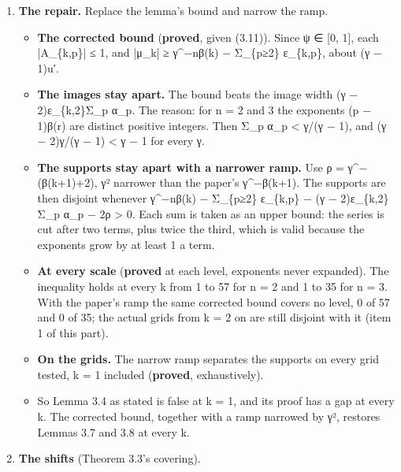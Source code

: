\begin{enumerate}
\begin{itemize}
\item The proof first bounds (3.11), μ with each α\_\allowbreak{}p cut to its first k terms, α\_\allowbreak{}p − ε\_\allowbreak{}\{k,p\}. That bound holds: its least gap on every grid tested is the last column, at least the margin, and exactly on it at k = 1.
\item It then says the tails Σ\_\allowbreak{}p ε\_\allowbreak{}\{k,p\}A\_\allowbreak{}\{k,p\}, with A\_\allowbreak{}\{k,p\} = ψ(d\_\allowbreak{}p) − ψ(d′\_\allowbreak{}p), are “too small to annihilate” γ\textasciicircum{}−nβ(k). That is true, and it does not retain |μ\_\allowbreak{}k| at or above γ\textasciicircum{}−nβ(k): at k = 1 the tails pull it from 10 units to 9.0999099….
\item So the lemma's bound fails at k = 1. At every k the proof's last step does not prove it.
\end{itemize}
\item \textbf{The repair.} Replace the lemma's bound and narrow the ramp.

\begin{itemize}
\item \textbf{The corrected bound} (\textbf{proved}, given (3.11)). Since ψ ∈ [0, 1], each |A\_\allowbreak{}\{k,p\}| ≤ 1, and |μ\_\allowbreak{}k| ≥ γ\textasciicircum{}−nβ(k) − Σ\_\allowbreak{}\{p≥2\} ε\_\allowbreak{}\{k,p\}, about (γ − 1)u′.
\item \textbf{The images stay apart.} The bound beats the image width (γ − 2)ε\_\allowbreak{}\{k,2\}Σ\_\allowbreak{}p α\_\allowbreak{}p. The reason: for n = 2 and 3 the exponents (p − 1)β(r) are distinct positive integers. Then Σ\_\allowbreak{}p α\_\allowbreak{}p < γ/(γ − 1), and (γ − 2)γ/(γ − 1) < γ − 1 for every γ.
\item \textbf{The supports stay apart with a narrower ramp.} Use ρ = γ\textasciicircum{}−(β(k+1)+2), γ² narrower than the paper's γ\textasciicircum{}−β(k+1). The supports are then disjoint whenever γ\textasciicircum{}−nβ(k) − Σ\_\allowbreak{}\{p≥2\} ε\_\allowbreak{}\{k,p\} − (γ − 2)ε\_\allowbreak{}\{k,2\}Σ\_\allowbreak{}p α\_\allowbreak{}p − 2ρ > 0. Each sum is taken as an upper bound: the series is cut after two terms, plus twice the third, which is valid because the exponents grow by at least 1 a term.
\item \textbf{At every scale} (\textbf{proved} at each level, exponents never expanded). The inequality holds at every k from 1 to 57 for n = 2 and 1 to 35 for n = 3. With the paper's ramp the same corrected bound covers no level, 0 of 57 and 0 of 35; the actual grids from k = 2 on are still disjoint with it (item 1 of this part).
\item \textbf{On the grids.} The narrow ramp separates the supports on every grid tested, k = 1 included (\textbf{proved}, exhaustively).
\item So Lemma 3.4 as stated is false at k = 1, and its proof has a gap at every k. The corrected bound, together with a ramp narrowed by γ², restores Lemmas 3.7 and 3.8 at every k.
\end{itemize}
\item \textbf{The shifts} (Theorem 3.3's covering).


\end{enumerate}

